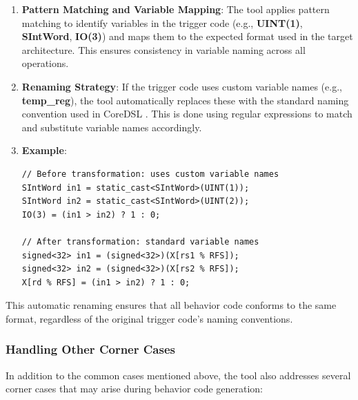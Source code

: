 \begin{enumerate}
    \item \textbf{Pattern Matching and Variable Mapping}: The tool applies pattern matching to identify variables in the trigger code (e.g., \textbf{UINT(1)}, \textbf{SIntWord}, \textbf{IO(3)}) and maps them to the expected format used in the target architecture. This ensures consistency in variable naming across all operations.

    \item \textbf{Renaming Strategy}: If the trigger code uses custom variable names (e.g., \textbf{temp\_reg}), the tool automatically replaces these with the standard naming convention used in CoreDSL . This is done using regular expressions to match and substitute variable names accordingly.

    \item \textbf{Example}:
    \begin{lstlisting}
// Before transformation: uses custom variable names
SIntWord in1 = static_cast<SIntWord>(UINT(1));
SIntWord in2 = static_cast<SIntWord>(UINT(2));
IO(3) = (in1 > in2) ? 1 : 0;

// After transformation: standard variable names
signed<32> in1 = (signed<32>)(X[rs1 % RFS]);
signed<32> in2 = (signed<32>)(X[rs2 % RFS]);
X[rd % RFS] = (in1 > in2) ? 1 : 0;
    \end{lstlisting}
\end{enumerate}

This automatic renaming ensures that all behavior code conforms to the same format, regardless of the original trigger code's naming conventions.

\subsubsection{Handling Other Corner Cases}

In addition to the common cases mentioned above, the tool also addresses several corner cases that may arise during behavior code generation:

